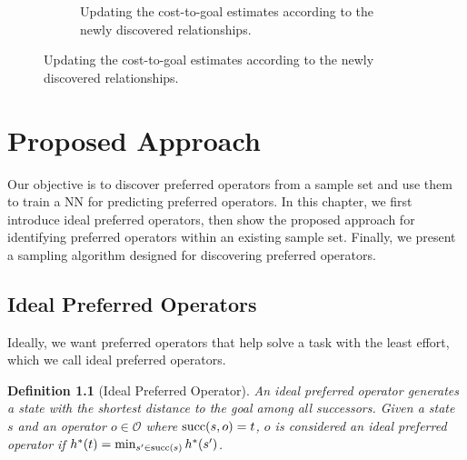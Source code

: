 \documentclass[ppgc,diss,english]{iiufrgs}
\newtheorem{definition}{Definition}
\begin{document}
\begin{figure}[htb]
\begin{subfigure}{0.60\linewidth}
{%
    }
    \vspace{\baselineskip}
    \caption{Updating the cost-to-goal estimates according to the newly discovered relationships.}
    \label{fig:subfig3}
  \end{subfigure}
  \label{fig:g-example}
\end{figure}


%
%
\chapter{Proposed Approach}
\label{cha:proposed-approach}
Our objective is to discover preferred operators from a sample set and use them to train a NN for predicting preferred operators. In this chapter, we first introduce ideal preferred operators, then show the proposed approach for identifying preferred operators within an existing sample set. Finally, we present a sampling algorithm designed for discovering preferred operators.


\section{Ideal Preferred Operators}
\label{sec:sample-ideal-po}
Ideally, we want preferred operators that help solve a task with the least effort, which we call ideal preferred operators.

\begin{definition}[Ideal Preferred Operator]\label{def:ideal_preferred_operator}
An ideal preferred operator generates a state with the shortest distance to the goal among all successors. Given a state $s$ and an operator $o \in \mathcal{O}$ where $\operatorname{succ}(s,o) = t$, $o$ is considered an ideal preferred operator if $h^*({t}) = \min_{s' \in \operatorname{succ}(s)} h^*({s'})$.
\end{definition}
\end{document}
